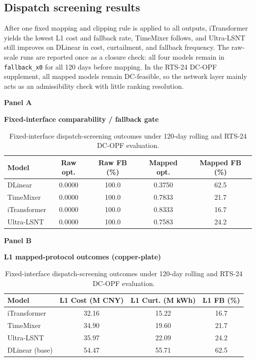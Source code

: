 ﻿\documentclass[review,1p,times]{elsarticle}
\newcommand{\aePanelHeading}[2]{%
  \par\vspace{2pt}%
  \noindent\begin{minipage}{\linewidth}
    \centering
    \textbf{#1}\par
    \textbf{#2}\par
  \end{minipage}%
  \par\vspace{2pt}%
}
\begin{document}
\subsection{Dispatch screening results}
\label{subsec:results_dispatch}
After one fixed mapping and clipping rule is applied to all outputs, iTransformer yields the lowest L1 cost and fallback rate, TimeMixer follows, and Ultra-LSNT still improves on DLinear in cost, curtailment, and fallback frequency. The raw-scale runs are reported once as a closure check: all four models remain in \texttt{fallback\_x0} for all 120 days before mapping. In the RTS-24 DC-OPF supplement, all mapped models remain DC-feasible, so the network layer mainly acts as an admissibility check with little ranking resolution.

\begin{table}[t]
\centering
\caption{Fixed-interface dispatch-screening outcomes under 120-day rolling and RTS-24 DC-OPF evaluation.}
\label{tab:table5_dispatch_value}
\label{tab:main4_dispatch_value}
\label{tab:dispatch_raw_vs_mapped}
\label{tab:master_dispatch}
\footnotesize
\setlength{\tabcolsep}{4pt}
\aePanelHeading{Panel A}{Fixed-interface comparability / fallback gate}
\begin{tabular*}{0.90\linewidth}{@{\extracolsep{\fill}}lcccc@{}}
\toprule
\textbf{Model} & \textbf{Raw opt.} & \textbf{Raw FB (\%)} & \textbf{Mapped opt.} & \textbf{Mapped FB (\%)} \\
\midrule
DLinear & 0.0000 & 100.0 & 0.3750 & 62.5 \\
TimeMixer & 0.0000 & 100.0 & 0.7833 & 21.7 \\
iTransformer & 0.0000 & 100.0 & 0.8333 & 16.7 \\
Ultra-LSNT & 0.0000 & 100.0 & 0.7583 & 24.2 \\
\bottomrule
\end{tabular*}
\vspace{4pt}
\aePanelHeading{Panel B}{L1 mapped-protocol outcomes (copper-plate)}
\begin{tabular*}{0.86\linewidth}{@{\extracolsep{\fill}}lccc@{}}
\toprule
\textbf{Model} & \textbf{L1 Cost (M CNY)} & \textbf{L1 Curt. (M kWh)} & \textbf{L1 FB (\%)} \\
\midrule
iTransformer & 32.16 & 15.22 & 16.7 \\
TimeMixer & 34.90 & 19.60 & 21.7 \\
Ultra-LSNT & 35.97 & 22.09 & 24.2 \\
DLinear (base) & 54.47 & 55.71 & 62.5 \\

\end{tabular*}
\end{table}
\end{document}
